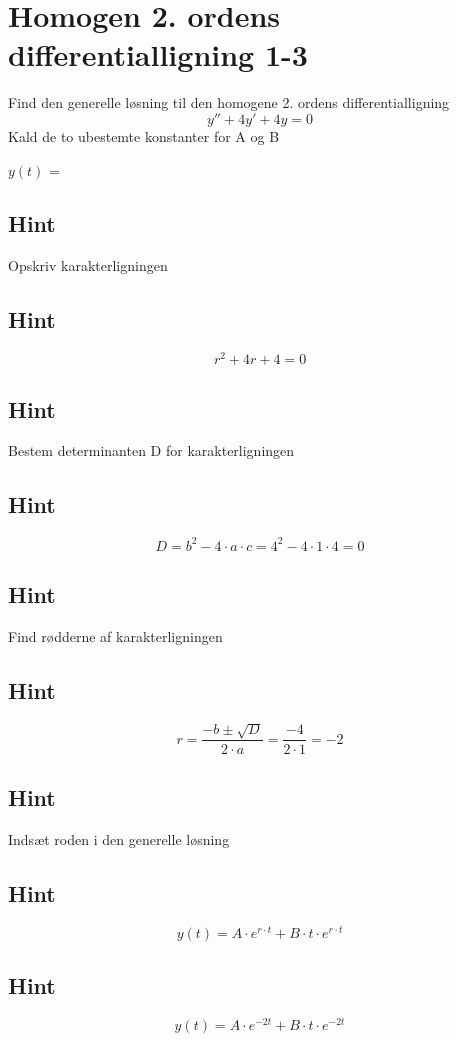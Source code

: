 \documentclass{article}
\newenvironment{exercise}[1]{\newpage\section{#1}}{}
\newcommand{\answerbox}[1]{\fbox{$#1$}}
\newcommand{\hint}{\subsection*{Hint}}
\begin{document}
\begin{exercise}{Homogen 2. ordens differentialligning 1-3}
	
	Find den generelle løsning til den homogene 2. ordens differentialligning
	\[
	y'' + 4y' + 4y = 0
	\]
	Kald de to ubestemte konstanter for A og B
	
	$y(t)$ = \answerbox{A \cdot e^{-2t} + B \cdot t \cdot e^{-2t}}
	
	
	\hint 
	
	Opskriv karakterligningen
	
	\hint
	
	\[
	r^2 + 4r + 4 = 0
	\]
	
	
	\hint
	
	Bestem determinanten D for karakterligningen
	
	
	\hint 
	\[
	D = b^2 - 4 \cdot a \cdot c = 4^2 - 4 \cdot 1 \cdot 4  = 0
	\]
	
	\hint 
	Find rødderne af karakterligningen
	
	
	\hint
	
	\[
	r = \frac{-b \pm \sqrt{D}}{2 \cdot a} = \frac{-4}{2 \cdot 1} = -2
	\]
	
	\hint
	
	Indsæt roden i den generelle løsning
	
	\hint
	\[
	y(t) = A \cdot e^{r \cdot t} + B \cdot t \cdot e^{r\cdot t}
	\]
	
	\hint
	
	\[
	y(t) = A \cdot e^{-2t} + B \cdot t \cdot e^{-2t}
	\]
	
	
\end{exercise}

\newpage
\end{document}
